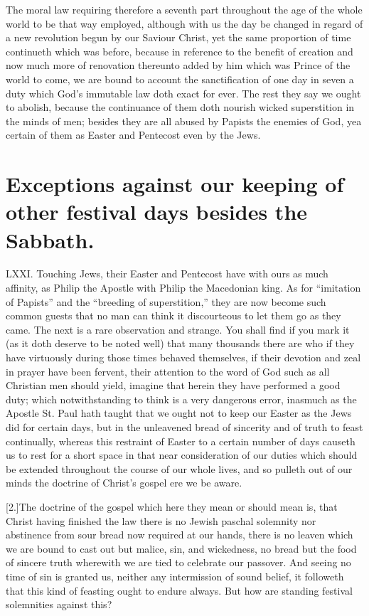 The moral law requiring therefore a seventh part throughout the age of the whole world to be that way employed, although with us the day be changed in regard of a new revolution begun by our Saviour Christ, yet the same proportion of time continueth which was before, because in reference to the benefit of creation and now much more of renovation thereunto added by him which was Prince of the world to come, we are bound to account the sanctification of one day in seven a duty which God’s immutable law doth exact for ever. The rest they say we ought to abolish, because the continuance of them doth nourish wicked superstition in the minds of men;  besides they are all abused by Papists the enemies of God, yea certain of them as Easter and Pentecost even by the Jews.


\section*{Exceptions against our keeping of other festival days besides the Sabbath.}
LXXI. Touching Jews, their Easter and Pentecost have with ours as much affinity, as Philip the Apostle with Philip the Macedonian king. As for “imitation of Papists” and the “breeding of superstition,” they are now become such common guests that no man can think it discourteous to let them go as they came. The next is a rare observation and strange. You shall find if you mark it (as it doth deserve to be noted well) that many thousands there are who if they have virtuously during those times behaved themselves, if their devotion and zeal in prayer have been fervent, their attention to the word of God such as all Christian men should yield, imagine that herein they have performed a good duty; which notwithstanding to think is a very dangerous error, inasmuch as the Apostle St. Paul hath taught that we ought  not to keep our Easter as the Jews did for certain days,
 but in the unleavened bread of sincerity and of truth to feast continually, whereas this restraint of Easter to a certain number of days causeth us to rest for a short space in that near consideration of our duties which should be extended throughout the course of our whole lives, and so pulleth out of our minds the doctrine of Christ’s gospel ere we be aware.

[2.]The doctrine of the gospel which here they mean or should mean is, that Christ having finished the law there is no Jewish paschal solemnity nor abstinence from sour bread now required at our hands, there is no leaven which we are bound to cast out but malice, sin, and wickedness, no bread but the food of sincere truth wherewith we are tied to celebrate our passover. And seeing no time of sin is granted us, neither any intermission of sound belief, it followeth that this kind of feasting ought to endure always. But how are standing festival solemnities against this?

